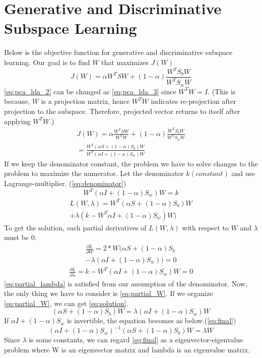 \section{Generative and Discriminative Subspace Learning}
\label{sec:intro}
Below is the objective function for generative and discriminative subspace learning. Our goal is to find $W$ that maximizes $J(W)$
\begin{equation}
	J(W) = \alpha W^TSW+(1-\alpha) \frac{W^TS_bW}{W^TS_wW}
	\label{eq:pca_lda_2}
\end{equation}
\cref{eq:pca_lda_2} can be changed as \cref{eq:pca_lda_3} since $W^TW=I$. (This is because, $W$ is a projection matrix, hence $W^TW$ indicates re-projection after projection to the subspace. Therefore, projected vector returns to itself after applying $W^TW$.)
\begin{multline}
	J(W) = \alpha \frac{W^TSW}{W^TW}+(1-\alpha) \frac{W^TS_bW}{W^TS_wW} \\
	= \frac{W^T(\alpha S + (1-\alpha)S_b)W}{W^T(\alpha I + (1-\alpha)S_w)W}
	\label{eq:pca_lda_3}
\end{multline}
If we keep the denominator constant, the problem we have to solve changes to the problem to maximize the numerator. Let the denominator $k(constant)$ and use Lagrange-multiplier. (\cref{eq:denominator})
\begin{equation}
	W^T(\alpha I + (1-\alpha)S_w)W = k
	\label{eq:denominator}
\end{equation}
\begin{multline}
	L(W,\lambda)=W^T(\alpha S + (1-\alpha)S_b)W \\
	+ \lambda(k-W^T\alpha I + (1-\alpha)S_w)W)
	\label{eq:lagrange}
\end{multline}
To get the solution, each partial derivatives of $L(W,\lambda)$ with respect to $W$ and $\lambda$ must be 0.
\begin{multline}
	\frac{\partial L}{\partial W} = 2*W(\alpha S+(1-\alpha)S_b \\
	-\lambda(\alpha I+(1-\alpha)S_w))=0
	\label{eq:partial_W}
\end{multline}
\begin{multline}
	\frac{\partial L}{\partial \lambda} = k - W^T(\alpha I+(1-\alpha)S_w)W=0
	\label{eq:partial_lambda}
\end{multline}
\cref{eq:partial_lambda} is satisfied from our assumption of the denominator. Now, the only thing we have to consider is \cref{eq:partial_W}. If we organize \cref{eq:partial_W}, we can get \cref{eq:solution}.
\begin{equation}
	(\alpha S+(1-\alpha)S_b)W = \lambda (\alpha I + (1-\alpha)S_w)W
	\label{eq:solution}
\end{equation}
If $\alpha I + (1-\alpha)S_w$ is invertible, the equation becomes as below.(\cref{eq:final})
\begin{equation}
	(\alpha I + (1-\alpha)S_w)^{-1}(\alpha S+(1-\alpha)S_b)W = \lambda W
	\label{eq:final}
\end{equation}
Since $\lambda$ is some constants, we can regard \cref{eq:final} as a eigenvector-eigenvalue problem where W is an eigenvector matrix and lambda is an eigenvalue matrix.


